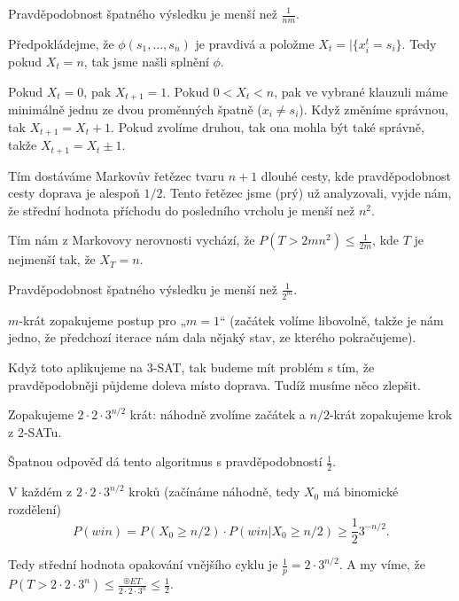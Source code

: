 \documentclass[12pt]{article}					%
\begin{document}
\begin{tvrzeni}
	Pravděpodobnost špatného výsledku je menší než $\frac{1}{nm}$.

	\begin{dukazin}
		Předpokládejme, že $\phi(s_1, …, s_n)$ je pravdivá a položme $X_t = |\{x_i^t = s_i\}$. Tedy pokud $X_t = n$, tak jsme našli splnění $\phi$.

		Pokud $X_t = 0$, pak $X_{t + 1} = 1$. Pokud $0 < X_t < n$, pak ve vybrané klauzuli máme minimálně jednu ze dvou proměnných špatně ($x_i ≠ s_i$). Když změníme správnou, tak $X_{t + 1} = X_t + 1$. Pokud zvolíme druhou, tak ona mohla být také správně, takže $X_{t + 1} = X_t ± 1$.

		Tím dostáváme Markovův řetězec tvaru $n+1$ dlouhé cesty, kde pravděpodobnost cesty doprava je alespoň $1 / 2$. Tento řetězec jsme (prý) už analyzovali, vyjde nám, že střední hodnota příchodu do posledního vrcholu je menší než $n^2$.

		Tím nám z Markovovy nerovnosti vychází, že $P(T > 2mn^2) ≤ \frac{1}{2m}$, kde $T$ je nejmenší tak, že $X_T = n$.
	\end{dukazin}
\end{tvrzeni}

\begin{tvrzeni}
	Pravděpodobnost špatného výsledku je menší než $\frac{1}{2^m}$.

	\begin{dukazin}
		$m$-krát zopakujeme postup pro „$m=1$“ (začátek volíme libovolně, takže je nám jedno, že předchozí iterace nám dala nějaký stav, ze kterého pokračujeme).
	\end{dukazin}
\end{tvrzeni}

\begin{poznamka}
	Když toto aplikujeme na 3-SAT, tak budeme mít problém s tím, že pravděpodobněji půjdeme doleva místo doprava. Tudíž musíme něco zlepšit.
\end{poznamka}

\begin{definice}
	Zopakujeme $2·2·3^{n / 2}$ krát: náhodně zvolíme začátek a $n / 2$-krát zopakujeme krok z 2-SATu.
\end{definice}

\begin{tvrzeni}
	Špatnou odpověď dá tento algoritmus s pravděpodobností $\frac{1}{2}$.

	\begin{dukazin}
		V každém z $2·2·3^{n / 2}$ kroků (začínáme náhodně, tedy $X_0$ má binomické rozdělení)
		$$ P(win) = P(X_0 ≥ n / 2) · P(win | X_0 ≥ n / 2) ≥ \frac{1}{2} 3^{-n / 2}. $$

		Tedy střední hodnota opakování vnějšího cyklu je $\frac{1}{p} = 2·3^{n / 2}$. A my víme, že $P(T > 2·2·3^n) ≤ \frac{®E T}{2·2·3^n} ≤ \frac{1}{2}$. 
	\end{dukazin}
\end{tvrzeni}
\end{document}

